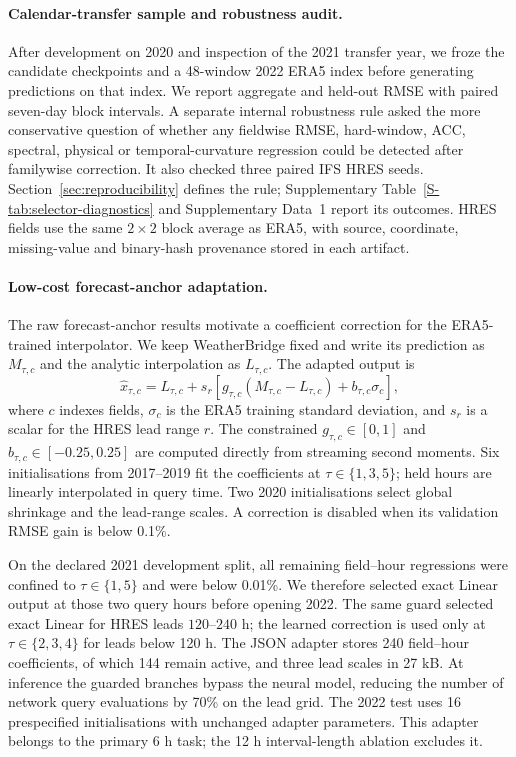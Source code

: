 \documentclass[referee,lineno,pdflatex,sn-nature]{sn-jnl}
\begin{document}
\begin{deferredmethodsrest}
\paragraph{Calendar-transfer sample and robustness audit.}
After development on 2020 and inspection of the 2021 transfer year, we froze
the candidate checkpoints and a 48-window 2022 ERA5 index before generating
predictions on that index. We report aggregate and held-out RMSE with paired
seven-day block intervals. A separate internal robustness rule asked the more
conservative question of whether any fieldwise RMSE, hard-window, ACC,
spectral, physical or temporal-curvature regression could be detected after
familywise correction. It also checked three paired IFS HRES seeds.
Section~\ref{sec:reproducibility} defines the rule; Supplementary
Table~\ref{S-tab:selector-diagnostics} and Supplementary Data~1 report its
outcomes. HRES fields use the same $2\times2$ block average as ERA5, with source,
coordinate, missing-value and binary-hash provenance stored in each artifact.

\paragraph{Low-cost forecast-anchor adaptation.}
The raw forecast-anchor results motivate a coefficient correction for the
ERA5-trained interpolator. We keep WeatherBridge fixed and write its
prediction as $M_{\tau,c}$ and the analytic interpolation as $L_{\tau,c}$.
The adapted output is
\begin{equation}
 \widehat{x}_{\tau,c}=L_{\tau,c}+s_{r}
 \left[g_{\tau,c}(M_{\tau,c}-L_{\tau,c})
       +b_{\tau,c}\sigma_c\right],
 \label{eq:nwp_adapter}
\end{equation}
where $c$ indexes fields, $\sigma_c$ is the ERA5 training standard deviation,
and $s_r$ is a scalar for the HRES lead range $r$. The constrained
$g_{\tau,c}\in[0,1]$ and
$b_{\tau,c}\in[-0.25,0.25]$ are computed directly from streaming second
moments. Six initialisations from 2017--2019 fit the coefficients at
$\tau\in\{1,3,5\}$; held hours are linearly interpolated in query time. Two
2020 initialisations select global shrinkage and the lead-range scales. A
correction is disabled when its validation RMSE gain is below 0.1\%.

On the declared 2021 development split, all remaining
field--hour regressions were confined to $\tau\in\{1,5\}$ and were below
0.01\%. We therefore selected exact Linear output at those two query hours before
opening 2022. The same guard selected exact Linear for HRES leads
$120$--$240$ h; the learned correction is used only at
$\tau\in\{2,3,4\}$ for leads below 120 h. The JSON adapter stores 240
field--hour coefficients, of which 144 remain active, and three lead scales in
27 kB. At inference the guarded branches bypass the neural model, reducing the
number of network query evaluations by 70\% on the lead grid. The 2022 test
uses 16 prespecified initialisations with unchanged adapter parameters. This
adapter belongs to the primary 6 h task; the 12 h interval-length ablation
excludes it.


\end{deferredmethodsrest}
\end{document}
